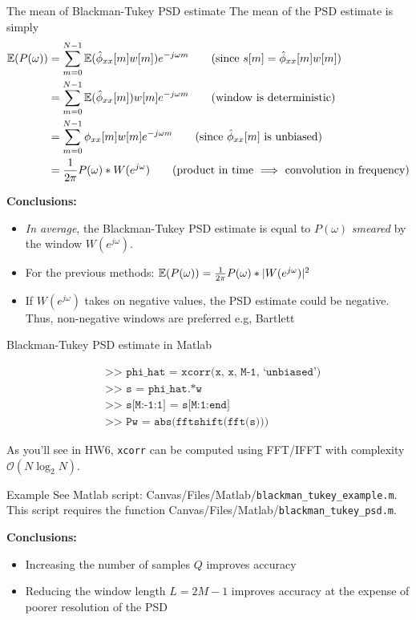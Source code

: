 \documentclass[10pt]{beamer}
\begin{document}
%
\begin{frame}{The mean of Blackman-Tukey PSD estimate}
The mean of the PSD estimate is simply
\begin{align*}
	\E(P(\omega)) &= \sum_{m = 0}^{N-1}\E(\hat{\phi}_{xx}[m]w[m])e^{-j\omega m} \tag{since $s[m] = \hat{\phi}_{xx}[m]w[m]$} \\
	& = \sum_{m = 0}^{N-1}\E(\hat{\phi}_{xx}[m])w[m]e^{-j\omega m} \tag{window is deterministic}\\
	& = \sum_{m = 0}^{N-1}\phi_{xx}[m]w[m]e^{-j\omega m} \tag{since $\hat{\phi}_{xx}[m]$ is unbiased} \\
	&= \frac{1}{2\pi}P(\omega)\ast W(e^{j\omega}) \tag{product in time $\implies$ convolution in frequency}
\end{align*}

\textbf{Conclusions:} 
\begin{itemize} 
	\item\textit{In average}, the Blackman-Tukey PSD estimate is equal to $P(\omega)$ \textit{smeared} by the window $W(e^{j\omega})$.
	\item For the previous methods: $\operatorname{\mathbb{E}}(P(\omega)) = \frac{1}{2\pi}P(\omega)\ast |W(e^{j\omega})|^2$
	\item If $W(e^{j\omega})$ takes on negative values, the PSD estimate could be negative. Thus, non-negative windows are preferred e.g, Bartlett
\end{itemize} 
\end{frame}

%
\begin{frame}{Blackman-Tukey PSD estimate in Matlab}

\begin{align*}
& \texttt{>> phi\_hat = xcorr(x, x, M-1, `unbiased')} \tag{unbiased autocorrelation estimate}\\
& \texttt{>> s = phi\_hat.*w} \tag{windowing} \\
& \texttt{>> s[M:-1:1] = s[M:1:end]} \tag{enforce even symmetry} \\
& \texttt{>> Pw = abs(fftshift(fft(s)))} \tag{two-sided PSD in interval $[-\pi, \pi)$}
\end{align*}

As you'll see in HW6, \texttt{xcorr} can be computed using FFT/IFFT with complexity $\mathcal{O}(N\log_2N)$.

\end{frame}

\begin{frame}{Example}
	See Matlab script: Canvas/Files/Matlab/\texttt{blackman\_tukey\_example.m}. This script requires the function Canvas/Files/Matlab/\texttt{blackman\_tukey\_psd.m}.
	
	\vspace{0.25cm}
	\textbf{Conclusions:} 
	\begin{itemize}
		\item Increasing the number of samples $Q$ improves accuracy
		\item Reducing the window length $L = 2M-1$ improves accuracy at the expense of poorer resolution of the PSD
	\end{itemize}
\end{frame}
\end{document}

